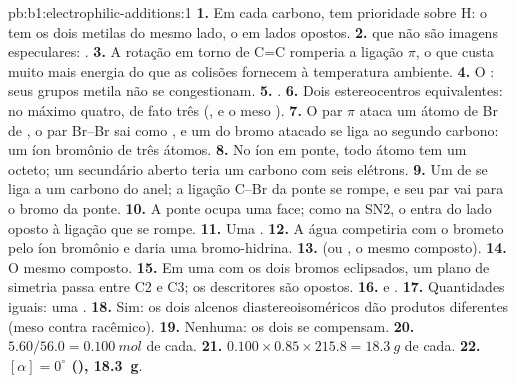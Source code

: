 \begin{solution}{pb:b1:electrophilic-additions:1}
\textbf{1.} Em cada carbono,  tem prioridade sobre H: o 
tem os dois metilas do mesmo lado, o  em lados opostos.
\textbf{2.}  que não são imagens especulares: .
\textbf{3.} A rotação em torno de C=C romperia a ligação $\pi$, o que custa
muito mais energia do que as colisões fornecem à temperatura ambiente.
\textbf{4.} O : seus grupos metila não se congestionam.
\textbf{5.} .
\textbf{6.} Dois estereocentros equivalentes: no máximo quatro, de fato
três (,  e o meso ).
\textbf{7.} O par $\pi$ ataca um átomo de Br de , o par Br--Br sai
como , e um  do bromo atacado se liga ao segundo
carbono: um íon bromônio de três átomos.
\textbf{8.} No íon em ponte, todo átomo tem um octeto; um 
secundário aberto teria um carbono com seis elétrons.
\textbf{9.} Um  de  se liga a um carbono do anel; a
ligação C--Br da ponte se rompe, e seu par vai para o bromo da ponte.
\textbf{10.} A ponte ocupa uma face; como na SN2, o  entra do
lado oposto à ligação que se rompe.
\textbf{11.} Uma .
\textbf{12.} A água competiria com o brometo pelo íon bromônio e daria uma
bromo-hidrina.
\textbf{13.}  (ou , o mesmo composto).
\textbf{14.} O mesmo composto.
\textbf{15.} Em uma  com os dois bromos eclipsados, um plano de
simetria passa entre C2 e C3; os descritores são opostos.
\textbf{16.}  e .
\textbf{17.} Quantidades iguais: uma .
\textbf{18.} Sim: os dois alcenos diastereoisoméricos dão produtos
diferentes (meso contra racêmico).
\textbf{19.} Nenhuma: os dois  se compensam.
\textbf{20.} $5.60/56.0 = \qty{0.100}{mol}$ de cada.
\textbf{21.} $0.100 \times 0.85 \times 215.8 = \qty{18.3}{g}$ de cada.
\textbf{22.} \textbf{$[\alpha] = 0^\circ$ (), \qty{18.3}{g}}.
\end{solution}
